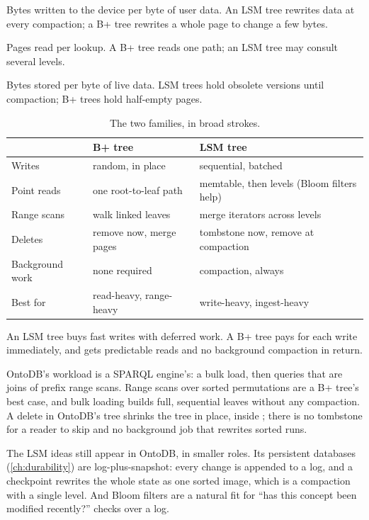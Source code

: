 \begin{description}[leftmargin=1.2em]
\item[Write amplification] Bytes written to the device per byte of user data. An LSM tree rewrites data at every compaction; a B+ tree rewrites a whole page to change a few bytes.
\item[Read amplification] Pages read per lookup. A B+ tree reads one path; an LSM tree may consult several levels.
\item[Space amplification] Bytes stored per byte of live data. LSM trees hold obsolete versions until compaction; B+ trees hold half-empty pages.
\end{description}

\begin{table}[ht]
\centering
\begin{tabular}{@{}lll@{}}
\toprule
& B+ tree & LSM tree \\
\midrule
Writes & random, in place & sequential, batched \\
Point reads & one root-to-leaf path & memtable, then levels (Bloom filters help) \\
Range scans & walk linked leaves & merge iterators across levels \\
Deletes & remove now, merge pages & tombstone now, remove at compaction \\
Background work & none required & compaction, always \\
Best for & read-heavy, range-heavy & write-heavy, ingest-heavy \\
\bottomrule
\end{tabular}
\caption{The two families, in broad strokes.}
\end{table}

\begin{keyidea}
An LSM tree buys fast writes with deferred work. A B+ tree pays for each write
immediately, and gets predictable reads and no background compaction in return.
\end{keyidea}

\begin{ontodb}
OntoDB's workload is a SPARQL engine's: a bulk load, then queries that are joins
of prefix range scans. Range scans over sorted permutations are a B+ tree's
best case, and bulk loading builds full, sequential leaves without any
compaction. A delete in OntoDB's tree shrinks the tree in place, inside
; there is no tombstone for a reader to skip and no
background job that rewrites sorted runs.

The LSM ideas still appear in OntoDB, in smaller roles. Its persistent
databases (\cref{ch:durability}) are log-plus-snapshot: every change is appended
to a log, and a checkpoint rewrites the whole state as one sorted image, which
is a compaction with a single level. And Bloom filters are a natural fit for
``has this concept been modified recently?'' checks over a log.
\end{ontodb}

